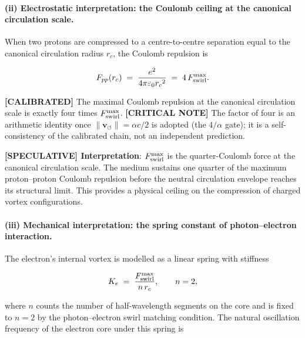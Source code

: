 \documentclass[11pt]{article}
\theoremstyle{definition}
\theoremstyle{plain}
\theoremstyle{remark}
\newcommand{\rc}{{r_c}}
\newcommand{\vnorm}{\lVert \mathbf{v}_{\!\boldsymbol{\circlearrowleft}} \rVert}
\begin{document}
        \paragraph{(ii) Electrostatic interpretation: the Coulomb ceiling at the canonical circulation scale.}

        When two protons are compressed to a centre-to-centre separation equal to the canonical circulation radius $\rc$, the Coulomb repulsion is

        \begin{align}
            F_{pp}(\rc)
            \;=\; \frac{e^2}{4\pi\varepsilon_0 \rc^2}
            \;=\; 4\,F_{\rm swirl}^{\max}.
            \label{eq:Coulomb_core}
        \end{align}

        \textbf{[CALIBRATED]} The maximal Coulomb repulsion at the canonical circulation scale is exactly four times $F_{\rm swirl}^{\max}$. \textbf{[CRITICAL NOTE]} The factor of four is an arithmetic identity once $\vnorm=\alpha c/2$ is adopted (the $4/\alpha$ gate); it is a self-consistency of the calibrated chain, not an independent prediction.

        \textbf{[SPECULATIVE] Interpretation}: $F_{\rm swirl}^{\max}$ is the quarter-Coulomb force at the canonical circulation scale. The medium sustains one quarter of the maximum proton--proton Coulomb repulsion before the neutral circulation envelope reaches its structural limit. This provides a physical ceiling on the compression of charged vortex configurations.

        \paragraph{(iii) Mechanical interpretation: the spring constant of photon--electron interaction.}

        The electron's internal vortex is modelled as a linear spring with stiffness

        \begin{align}
            K_e \;=\; \frac{F_{\rm swirl}^{\max}}{n\,\rc},
            \qquad n = 2,
            \label{eq:spring_K}
        \end{align}

        where $n$ counts the number of half-wavelength segments on the core and is fixed to $n=2$ by the photon--electron swirl matching condition. The natural oscillation frequency of the electron core under this spring is
\end{document}
